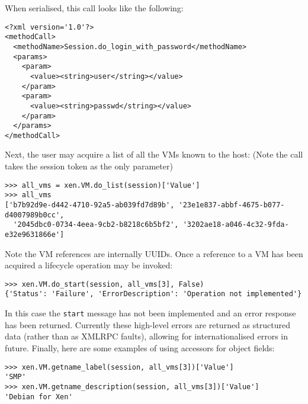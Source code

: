 When serialised, this call looks like the following:

\begin{verbatim}
<?xml version='1.0'?>
<methodCall>
  <methodName>Session.do_login_with_password</methodName>
  <params>
    <param>
      <value><string>user</string></value>
    </param>
    <param>
      <value><string>passwd</string></value>
    </param>
  </params>
</methodCall>
\end{verbatim}

Next, the user may acquire a list of all the VMs known to the host: (Note the call takes the session token as the only parameter)

\begin{verbatim}
>>> all_vms = xen.VM.do_list(session)['Value']
>>> all_vms
['b7b92d9e-d442-4710-92a5-ab039fd7d89b', '23e1e837-abbf-4675-b077-d4007989b0cc',
  '2045dbc0-0734-4eea-9cb2-b8218c6b5bf2', '3202ae18-a046-4c32-9fda-e32e9631866e']
\end{verbatim}

Note the VM references are internally UUIDs. Once a reference to a VM has been acquired a lifecycle operation may be invoked:

\begin{verbatim}
>>> xen.VM.do_start(session, all_vms[3], False)
{'Status': 'Failure', 'ErrorDescription': 'Operation not implemented'}
\end{verbatim}

In this case the {\tt start} message has not been implemented and an error response has been returned. Currently these high-level errors are returned as structured data (rather than as XMLRPC faults), allowing for internationalised errors in future. Finally, here are some examples of using accessors for object fields:

\begin{verbatim}
>>> xen.VM.getname_label(session, all_vms[3])['Value']
'SMP'
>>> xen.VM.getname_description(session, all_vms[3])['Value']
'Debian for Xen'
\end{verbatim}
